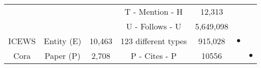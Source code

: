 \begin{table}[ht!]
\begin{tabular}{@{}ccccccc@{}}
                            &               &           & T - Mention  - H      & 12,313    &                               &                           \\
                            &               &           & U - Follows  - U      & 5,649,098 &                               &                           \\ \midrule
    \multirow{1}{*}{ICEWS}  & Entity (E)    & 10,463    & 123 different types   & 915,028   & \multirow{1}{*}{$\bullet$}    & \multirow{1}{*}{}         \\ \midrule
    \multirow{1}{*}{Cora}   & Paper (P)     & 2,708     & P - Cites - P         & 10556     & \multirow{1}{*}{}             & \multirow{1}{*}{$\bullet$}\\ 
    \bottomrule
\end{tabular}
\end{table}